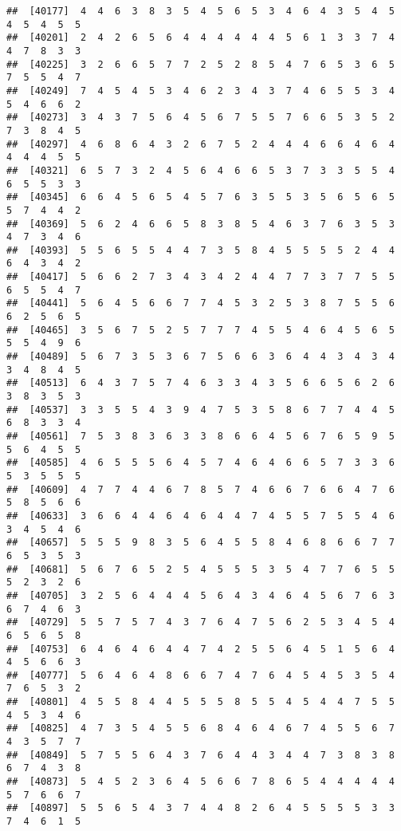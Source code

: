 \documentclass[
]{book}
\begin{document}
\begin{verbatim}
##  [40177]  4  4  6  3  8  3  5  4  5  6  5  3  4  6  4  3  5  4  5  4  5  4  5  5
##  [40201]  2  4  2  6  5  6  4  4  4  4  4  4  5  6  1  3  3  7  4  4  7  8  3  3
##  [40225]  3  2  6  6  5  7  7  2  5  2  8  5  4  7  6  5  3  6  5  7  5  5  4  7
##  [40249]  7  4  5  4  5  3  4  6  2  3  4  3  7  4  6  5  5  3  4  5  4  6  6  2
##  [40273]  3  4  3  7  5  6  4  5  6  7  5  5  7  6  6  5  3  5  2  7  3  8  4  5
##  [40297]  4  6  8  6  4  3  2  6  7  5  2  4  4  4  6  6  4  6  4  4  4  4  5  5
##  [40321]  6  5  7  3  2  4  5  6  4  6  6  5  3  7  3  3  5  5  4  6  5  5  3  3
##  [40345]  6  6  4  5  6  5  4  5  7  6  3  5  5  3  5  6  5  6  5  5  7  4  4  2
##  [40369]  5  6  2  4  6  6  5  8  3  8  5  4  6  3  7  6  3  5  3  4  7  3  4  6
##  [40393]  5  5  6  5  5  4  4  7  3  5  8  4  5  5  5  5  2  4  4  6  4  3  4  2
##  [40417]  5  6  6  2  7  3  4  3  4  2  4  4  7  7  3  7  7  5  5  6  5  5  4  7
##  [40441]  5  6  4  5  6  6  7  7  4  5  3  2  5  3  8  7  5  5  6  6  2  5  6  5
##  [40465]  3  5  6  7  5  2  5  7  7  7  4  5  5  4  6  4  5  6  5  5  5  4  9  6
##  [40489]  5  6  7  3  5  3  6  7  5  6  6  3  6  4  4  3  4  3  4  3  4  8  4  5
##  [40513]  6  4  3  7  5  7  4  6  3  3  4  3  5  6  6  5  6  2  6  3  8  3  5  3
##  [40537]  3  3  5  5  4  3  9  4  7  5  3  5  8  6  7  7  4  4  5  6  8  3  3  4
##  [40561]  7  5  3  8  3  6  3  3  8  6  6  4  5  6  7  6  5  9  5  5  6  4  5  5
##  [40585]  4  6  5  5  5  6  4  5  7  4  6  4  6  6  5  7  3  3  6  5  3  5  5  5
##  [40609]  4  7  7  4  4  6  7  8  5  7  4  6  6  7  6  6  4  7  6  5  8  5  6  6
##  [40633]  3  6  6  4  4  6  4  6  4  4  7  4  5  5  7  5  5  4  6  3  4  5  4  6
##  [40657]  5  5  5  9  8  3  5  6  4  5  5  8  4  6  8  6  6  7  7  6  5  3  5  3
##  [40681]  5  6  7  6  5  2  5  4  5  5  5  3  5  4  7  7  6  5  5  5  2  3  2  6
##  [40705]  3  2  5  6  4  4  4  5  6  4  3  4  6  4  5  6  7  6  3  6  7  4  6  3
##  [40729]  5  5  7  5  7  4  3  7  6  4  7  5  6  2  5  3  4  5  4  6  5  6  5  8
##  [40753]  6  4  6  4  6  4  4  7  4  2  5  5  6  4  5  1  5  6  4  4  5  6  6  3
##  [40777]  5  6  4  6  4  8  6  6  7  4  7  6  4  5  4  5  3  5  4  7  6  5  3  2
##  [40801]  4  5  5  8  4  4  5  5  5  8  5  5  4  5  4  4  7  5  5  4  5  3  4  6
##  [40825]  4  7  3  5  4  5  5  6  8  4  6  4  6  7  4  5  5  6  7  4  3  5  7  7
##  [40849]  5  7  5  5  6  4  3  7  6  4  4  3  4  4  7  3  8  3  8  6  7  4  3  8
##  [40873]  5  4  5  2  3  6  4  5  6  6  7  8  6  5  4  4  4  4  4  5  7  6  6  7
##  [40897]  5  5  6  5  4  3  7  4  4  8  2  6  4  5  5  5  5  3  3  7  4  6  1  5

\end{verbatim}
\end{document}
